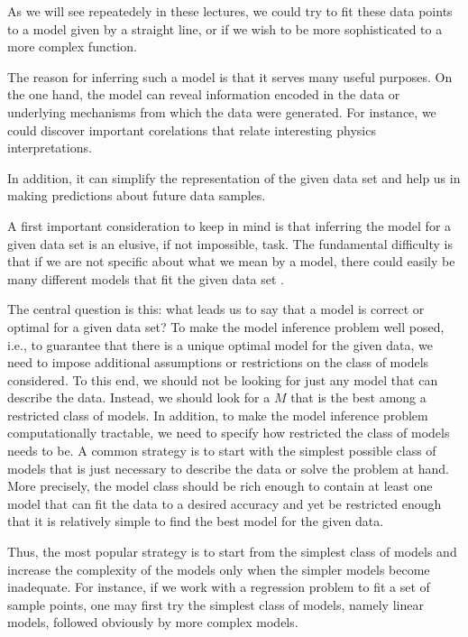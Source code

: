 \documentclass[letterpaper,10pt,english]{sphinxmanual}
\begin{document}
As we will see repeatedely in these lectures, we could try to fit these data points to a model given by a
straight line, or if we wish to be more sophisticated to a more complex
function.

The reason for inferring such a model is that it
serves many useful purposes. On the one hand, the model can reveal information
encoded in the data or underlying mechanisms from which the data were generated. For instance, we could discover important
corelations that relate interesting physics interpretations.

In addition, it can simplify the representation of the given data set and help
us in making predictions about  future data samples.

A first important consideration to keep in mind is that inferring the  model
for a given data set is an elusive, if not impossible, task. The fundamental difficulty
is that if we are not specific about what we mean by a  model, there
could easily be many different models that fit the given data set .

The central question is this: what leads us to say that a model is correct or
optimal for a given data set? To make the model inference problem well posed, i.e.,
to guarantee that there is a unique optimal model for the given data, we need to
impose additional assumptions or restrictions on the class of models considered. To
this end, we should not be looking for just any model that can describe the data.
Instead, we should look for a  \(M\) that is the best among a restricted class
of models. In addition, to make the model inference problem computationally
tractable, we need to specify how restricted the class of models needs to be. A
common strategy is to start
with the simplest possible class of models that is just necessary to describe the data
or solve the problem at hand. More precisely, the model class should be rich enough
to contain at least one model that can fit the data to a desired accuracy and yet be
restricted enough that it is relatively simple to find the best model for the given data.

Thus, the most popular strategy is to start from the
simplest class of models and increase the complexity of the models only when the
simpler models become inadequate. For instance, if we work with a regression problem to fit a set of sample points, one
may first try the simplest class of models, namely linear models, followed obviously by more complex models.
\end{document}

